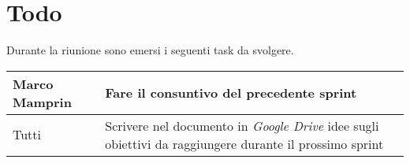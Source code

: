 \section{Todo}
Durante la riunione sono emersi i seguenti task da svolgere.

\begin{center}
  \begin{tabular}{|p{5cm}|p{7cm}|}
    \hline
    Marco Mamprin & Fare il consuntivo del precedente sprint  \\ \hline
    \hline
    Tutti & Scrivere nel documento in \textit{Google Drive} idee sugli obiettivi da raggiungere durante il prossimo sprint   \\ \hline
  \end{tabular}
\end{center}
